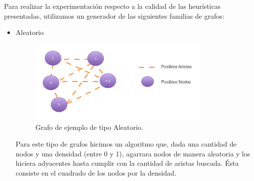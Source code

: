 
Para realizar la experimentación respecto a la calidad de las heurísticas presentadas, utilizamos un generador de las siguientes familias de grafos:
\begin{itemize}
\item Aleatorio
 \begin{figure}[H] %
\begin{center}
\includegraphics[width=250pt]{../imgs/aleatorio.png}
\caption{Grafo de ejemplo de tipo Aleatorio.}
\end{center}
\end{figure}
 Para este tipo de grafos hicimos un algoritmo que, dada una cantidad de nodos y una densidad (entre 0 y 1), agarrara nodos de manera aleatoria y los hiciera adyacentes hasta cumplir con la cantidad de aristas buscada. Ésta consiste en el cuadrado de los nodos por la densidad.


\end{itemize}
